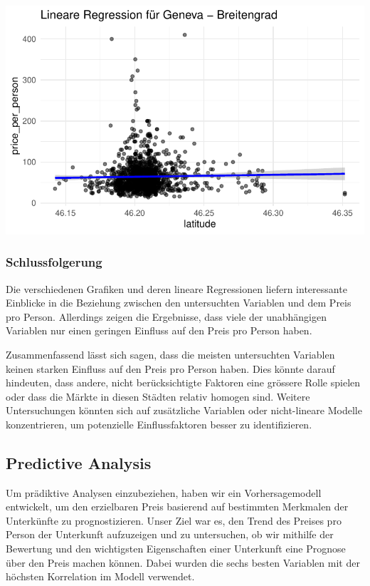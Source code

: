 \documentclass[
  journal,
]{IEEEtran}%
\begin{document}
\includegraphics{main_files/figure-pdf/unnamed-chunk-15-8.pdf}

\hypertarget{schlussfolgerung}{%
\subsubsection{Schlussfolgerung}\label{schlussfolgerung}}

Die verschiedenen Grafiken und deren lineare Regressionen liefern
interessante Einblicke in die Beziehung zwischen den untersuchten
Variablen und dem Preis pro Person. Allerdings zeigen die Ergebnisse,
dass viele der unabhängigen Variablen nur einen geringen Einfluss auf
den Preis pro Person haben.

Zusammenfassend lässt sich sagen, dass die meisten untersuchten
Variablen keinen starken Einfluss auf den Preis pro Person haben. Dies
könnte darauf hindeuten, dass andere, nicht berücksichtigte Faktoren
eine grössere Rolle spielen oder dass die Märkte in diesen Städten
relativ homogen sind. Weitere Untersuchungen könnten sich auf
zusätzliche Variablen oder nicht-lineare Modelle konzentrieren, um
potenzielle Einflussfaktoren besser zu identifizieren.

\hypertarget{predictive-analysis-1}{%
\subsection{Predictive Analysis}\label{predictive-analysis-1}}

Um prädiktive Analysen einzubeziehen, haben wir ein Vorhersagemodell
entwickelt, um den erzielbaren Preis basierend auf bestimmten Merkmalen
der Unterkünfte zu prognostizieren. Unser Ziel war es, den Trend des
Preises pro Person der Unterkunft aufzuzeigen und zu untersuchen, ob wir
mithilfe der Bewertung und den wichtigsten Eigenschaften einer
Unterkunft eine Prognose über den Preis machen können. Dabei wurden die
sechs besten Variablen mit der höchsten Korrelation im Modell verwendet.
\end{document}
